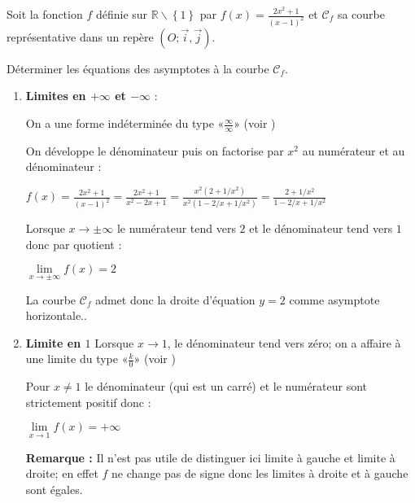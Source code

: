 
%
Soit la fonction $f$ définie sur $\mathbb{R}\backslash\left\{1\right\}$ par $f\left(x\right)=\frac{2x^{2}+1}{\left(x-1\right)^{2}}$ et $ \mathscr C_{f} $ sa courbe représentative dans un repère $\left(O ; \vec{i}, \vec{j}\right)$.
\par
Déterminer les équations des asymptotes à la courbe $ \mathscr C_{f} $.
\begin{corrige}
     \begin{enumerate}
          \item
          \textbf{Limites en $+\infty $ et $-\infty $} :
          \par
          On a une forme indéterminée du type «$\frac{ \infty}{\infty} $» (voir )
          \par
          On développe le dénominateur puis on factorise par $x^{2}$ au numérateur et au dénominateur :
          \par
          $f\left(x\right)=\frac{2x^{2}+1}{\left(x-1\right)^{2}}=\frac{2x^{2}+1}{x^{2}-2x+1}=\frac{x^{2}\left(2+1/x^{2}\right)}{x^{2}\left(1-2/x+1/x^{2}\right)}=\frac{2+1/x^{2}}{1-2/x+1/x^{2}} $
          \par
          Lorsque $x\rightarrow \pm \infty $ le numérateur tend vers $2$ et le dénominateur tend vers $1$ donc par quotient :
          \par
          $\lim\limits_{x\rightarrow \pm \infty }f\left(x\right)=2$
          \par
          La courbe $\mathscr C_{f}$ admet donc la droite d'équation $y=2$ comme asymptote horizontale..
          \item
          \textbf{Limite en $1$}
          Lorsque $x\rightarrow 1$, le dénominateur tend vers zéro; on a affaire à une limite du type «$\frac{k}{0}$» (voir )
          \par
          Pour $x\neq 1$ le dénominateur (qui est un carré) et le numérateur sont strictement positif donc :
          \par
          $\lim\limits_{x\rightarrow 1}f\left(x\right)=+\infty $
\par
          \textbf{Remarque : }Il n'est pas utile de distinguer ici limite à gauche et limite à droite; en effet $f$ ne change pas de signe donc les limites à droite et à gauche sont égales.

\end{enumerate}
\end{corrige}
